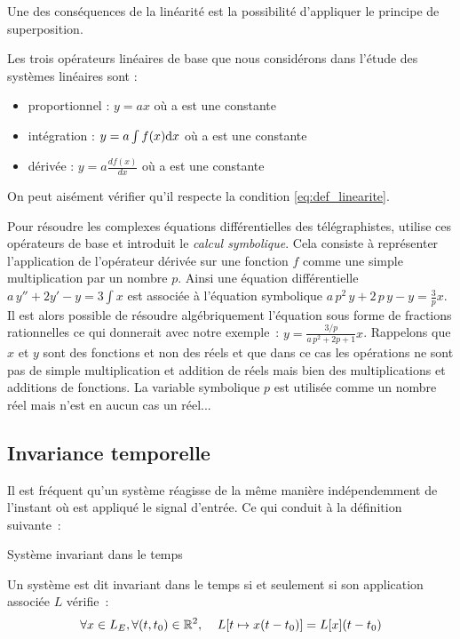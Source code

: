 	Une des conséquences de la linéarité est la possibilité
        d'appliquer le principe de superposition.
	
	Les trois opérateurs linéaires de base que nous considérons
        dans l'étude des systèmes linéaires sont :
	\begin{itemize}
        \item proportionnel : $y = a x$ où a est une constante
        \item intégration : $y = a \int f(x) \mathrm{d{}} x $ où a est
          une constante
        \item dérivée : $y = a \frac{df(x)}{dx} $ où a est une
          constante
	\end{itemize}
	On peut aisément vérifier qu'il respecte la condition
        \ref{eq:def_linearite}.

        \begin{remarque}
          Pour résoudre les complexes équations différentielles des
          télégraphistes, \Heaviside{} utilise ces opérateurs de base
          et introduit le \emph{calcul symbolique}. Cela consiste à
          représenter l'application de l'opérateur dérivée sur une
          fonction $f$ comme une simple multiplication par un nombre
          $p$. Ainsi une équation différentielle
          $a\,y'' + 2y' -y = 3\int x$ est associée à l'équation
          symbolique $a\,p^2\,y + 2\,p\,y - y = \frac{3}{p}x$. Il est
          alors possible de résoudre algébriquement l'équation sous
          forme de fractions rationnelles ce qui donnerait avec notre
          exemple~: $y = \frac{3/p}{a\,p^2+2p+1} x$. Rappelons que $x$
          et $y$ sont des fonctions et non des réels et que dans ce
          cas les opérations ne sont pas de simple multiplication et
          addition de réels mais bien des multiplications et additions
          de fonctions. La variable symbolique $p$ est utilisée comme
          un nombre réel mais n'est en aucun cas un réel...
        \end{remarque}
	
	\subsection{Invariance temporelle}
	Il est fréquent qu'un système réagisse de la même manière
        indépendemment de l'instant où est appliqué le signal
        d'entrée. Ce qui conduit à la définition suivante~:
	\begin{definition}{Système invariant dans le temps}
          
          Un système est dit invariant dans le temps si et seulement
          si son application associée $L$ vérifie~:
          \begin{equation}
            \forall x\in L_E, \forall (t,t_0)\in \mathbb{R}^2, \;\;\;\; L[t\mapsto x(t-t_{0})] = L[x](t-t_{0}) 
          \end{equation}
	\end{definition}
	
